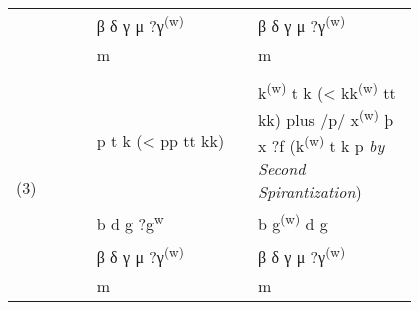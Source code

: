 {\begin{table}[H]
\begin{tabular}{lp{0.4\linewidth}p{0.4\linewidth}}
 & β δ γ μ ?γ\textsuperscript{(w)} & β δ γ μ ?γ\textsuperscript{(w)} \\
 & m & m \\\\
\multirow{4}{*}{(3)} & p t k (< pp tt kk) & k\textsuperscript{(w)} t k (< kk\textsuperscript{(w)} tt kk) plus /p/ x\textsuperscript{(w)} þ x ?f (k\textsuperscript{(w)} t k p \textit{by Second Spirantization}) \\
 & b d g ?g\textsuperscript{w} & b g\textsuperscript{(w)} d g \\
 & β δ γ μ ?γ\textsuperscript{(w)} & β δ γ μ ?γ\textsuperscript{(w)} \\
 & m & m
\end{tabular}
\end{table}


}
